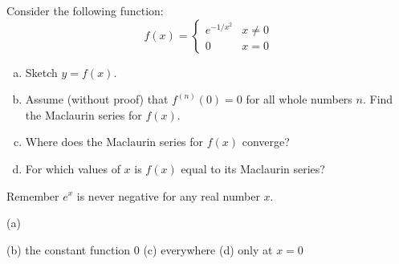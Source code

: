 \begin{question}
Consider the following function:
\[f(x)=\begin{cases}
e^{-1/x^2} & x \neq 0\\
0 & x=0
\end{cases}\]
\begin{enumerate}[(a)]
	\item Sketch $y=f(x)$.
	\item Assume (without proof) that $f^{(n)}(0)=0$ for all whole numbers $n$. Find the Maclaurin series for $f(x)$.
	\item Where does the Maclaurin series for $f(x)$ converge?
	\item For which values of $x$ is $f(x)$ equal to its Maclaurin series?
	\end{enumerate}
\end{question}
\begin{hint}
	Remember $e^x$ is never negative for any real number $x$.
\end{hint}
\begin{answer}
	(a) 	

	(b) the constant function 0 \qquad (c) everywhere \qquad (d) only at $x=0$
\end{answer}
